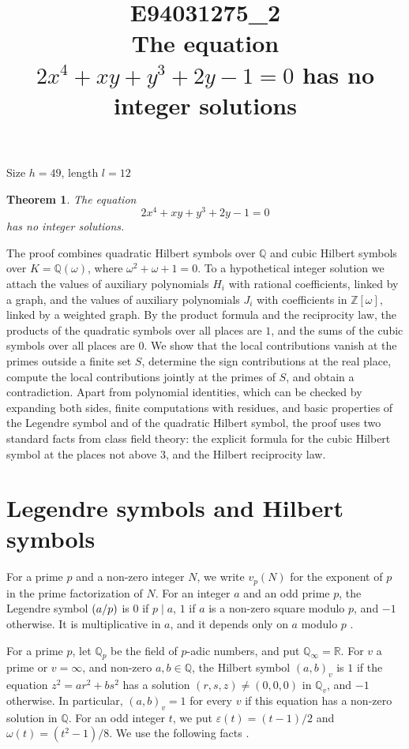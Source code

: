 \documentclass[11pt]{article}
\title{\textbf{E94031275\_2}\\[4pt] {\Large The equation $2x^{4}+xy+y^{3}+2y-1=0$ has no integer solutions}}
\author{}
\date{}
\newtheorem{theorem}{Theorem}
\newcommand{\Z}{\mathbb{Z}}
\newcommand{\Q}{\mathbb{Q}}
\newcommand{\leg}[2]{\mathchoice{\biggl(\dfrac{#1}{#2}\biggr)}{(#1/#2)}{(#1/#2)}{(#1/#2)}}
\begin{document}
\maketitle
\vspace{-8ex}
\begin{center}
Size $h=49$, length $l=12$
\end{center}

\begin{theorem}\label{thm:main}
The equation
\begin{equation}\label{eq:main}
2x^{4}+xy+y^{3}+2y-1=0
\end{equation}
has no integer solutions.
\end{theorem}

The proof combines quadratic Hilbert symbols over $\Q$ and cubic Hilbert symbols over $K=\Q(\omega)$, where $\omega^2+\omega+1=0$. To a hypothetical integer solution we attach the values of auxiliary polynomials $H_i$ with rational coefficients, linked by a graph, and the values of auxiliary polynomials $J_i$ with coefficients in $\Z[\omega]$, linked by a weighted graph. By the product formula and the reciprocity law, the products of the quadratic symbols over all places are $1$, and the sums of the cubic symbols over all places are $0$. We show that the local contributions vanish at the primes outside a finite set $S$, determine the sign contributions at the real place, compute the local contributions jointly at the primes of $S$, and obtain a contradiction. Apart from polynomial identities, which can be checked by expanding both sides, finite computations with residues, and basic properties of the Legendre symbol and of the quadratic Hilbert symbol, the proof uses two standard facts from class field theory: the explicit formula for the cubic Hilbert symbol at the places not above $3$, and the Hilbert reciprocity law.

\section{Legendre symbols and Hilbert symbols}

For a prime $p$ and a non-zero integer $N$, we write $v_p(N)$ for the exponent of $p$ in the prime factorization of $N$. For an integer $a$ and an odd prime $p$, the Legendre symbol $\leg{a}{p}$ is $0$ if $p\mid a$, $1$ if $a$ is a non-zero square modulo $p$, and $-1$ otherwise. It is multiplicative in $a$, and it depends only on $a$ modulo $p$ \cite[Chapter~5]{IR}.

For a prime $p$, let $\Q_p$ be the field of $p$-adic numbers, and put $\Q_\infty=\mathbb R$. For $v$ a prime or $v=\infty$, and non-zero $a,b\in\Q$, the Hilbert symbol $(a,b)_v$ is $1$ if the equation $z^2=ar^2+bs^2$ has a solution $(r,s,z)\neq(0,0,0)$ in $\Q_v$, and $-1$ otherwise. In particular, $(a,b)_v=1$ for every $v$ if this equation has a non-zero solution in $\Q$. For an odd integer $t$, we put $\varepsilon(t)=(t-1)/2$ and $\omega(t)=(t^2-1)/8$. We use the following facts \cite[Chapter~III, Proposition~2 and Theorems~1 and~3]{Se}.
\end{document}
